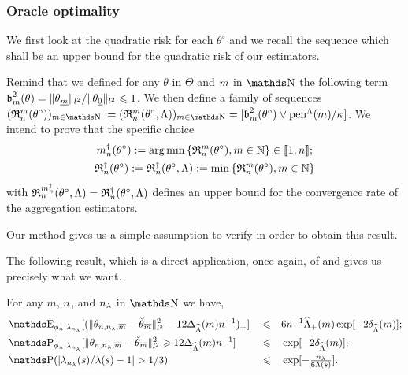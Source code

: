 \subsubsection{Oracle optimality}
We first look at the quadratic risk for each $\theta^{\circ}$ and we recall the sequence which shall be an upper bound for the quadratic risk of our estimators.
\begin{de*}
Remind that we defined for any $\theta$ in $\Theta$ and $\Di$ in $\N$ the following term $\b_{m}^{2}(\theta) = \Vert \theta_{\underline{m}} \Vert_{l^{2}}/\Vert \theta_{\underline{0}} \Vert_{l^{2}} \leq 1$.
We then define a family of sequences $(\daRa{\Di}{(\xdf)})_{\Di \in \N} := (\daRa{\Di}{(\xdf,\Lambda)})_{\Di \in \N} = [\b_{m}^{2}(\theta^{\circ}) \vee \penSv/\cpen]$.
We intend to prove that the specific choice
\begin{multline*}
\aDi{\ssY}(\xdf):=\argmin\Nset[\Di\in\Nz]{\daRa{\Di}{(\xdf)}}\in\nset{1,\ssY}; \\
\naRa{(\xdf)}:=\naRa{(\xdf,\Lambda)}:=\min\Nset[\Di\in\Nz]{\daRa{\Di}{(\xdf)}}
\end{multline*}
with $\daRa{\aDi{\ssY}}{(\xdf,\Lambda)}=\naRa{(\xdf,\Lambda)}$ defines an upper bound for the convergence rate of the aggregation estimators.
\assEnd
\end{de*}
Our method gives us a simple assumption to verify in order to obtain this result.

The following result, which is a direct application, once again, of  and  gives us precisely what we want.
\begin{cor*}
For any $m$, $\ssY$, and $\ssE$ in $\N$ we have,
\begin{alignat*}{3}
& \E_{\phi_{n} \vert \lambda_{n_{\lambda}}}[(\Vert \theta_{n, n_{\lambda}, \overline{m}} - \dxdfPr \Vert_{l^{2}}^{2} - 12 \Delta_{\widehat{\Lambda}}(m) n ^{-1})_{+}] && \leq && 6 n^{-1} \widehat{\Lambda}_{+}(m) \exp[- 2 \delta_{\widehat{\Lambda}}(m)];\\
& \P_{\phi_{n} \vert \lambda_{n_{\lambda}}}[\Vert \theta_{n, n_{\lambda}, \overline{m}} - \dxdfPr \Vert_{l^{2}}^{2} \geq 12 \Delta_{\widehat{\Lambda}}(m) n ^{-1}] && \leq && \exp[- 2 \delta_{\widehat{\Lambda}}(m)];\\
& \P(\vert \lambda_{n_{\lambda}}(s)/\lambda(s) - 1 \vert > 1/3) && \leq && \exp[-\tfrac{n_{\lambda}}{6 \Lambda(s)}].
\end{alignat*}
\reEnd
\end{cor*}

